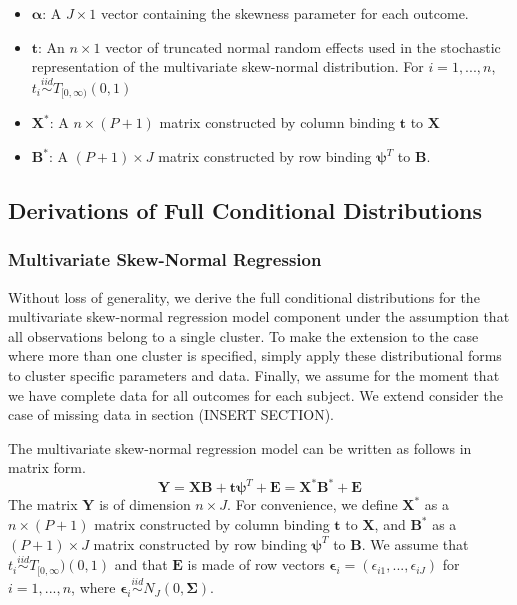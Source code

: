 \documentclass{article}
\begin{document}
\begin{itemize}
    \item $\boldsymbol\alpha$: A $J \times 1$ vector containing the skewness parameter for each outcome.
    
    \item $\mathbf{t}$: An $n \times 1$ vector of truncated normal random effects used in the stochastic representation of the multivariate skew-normal distribution. For $i = 1,...,n$, $t_i \stackrel{iid}{\sim}T_{[0,\infty)}(0,1)$
    
    \item $\mathbf{X}^*$: A $n \times (P + 1)$ matrix constructed by column binding $\mathbf{t}$ to $\mathbf{X}$
    
    \item $\mathbf{B}^*$: A $(P+1) \times J$ matrix constructed by row binding $\boldsymbol\psi^T$ to $\mathbf{B}$.

\end{itemize}

\newpage
\subsection{Derivations of Full Conditional Distributions}

\subsubsection{Multivariate Skew-Normal Regression}

Without loss of generality, we derive the full conditional distributions for the multivariate skew-normal regression model component under the assumption that all observations belong to a single cluster. To make the extension to the case where more than one cluster is specified, simply apply these distributional forms to cluster specific parameters and data. Finally, we assume for the moment that we have complete data for all outcomes for each subject. We extend consider the case of missing data in section (INSERT SECTION).

The multivariate skew-normal regression model can be written as follows in matrix form. 
$$\mathbf{Y} = \mathbf{X}\mathbf{B} + \mathbf{t} \boldsymbol\psi^T + \mathbf{E} = \mathbf{X}^* \mathbf{B}^* + \mathbf{E}$$
The matrix $\mathbf{Y}$ is of dimension $n \times J$. For convenience, we define $\mathbf{X}^*$ as a $n \times (P + 1)$ matrix constructed by column binding $\mathbf{t}$ to $\mathbf{X}$, and $\mathbf{B}^*$ as a $(P+1) \times J$ matrix constructed by row binding $\boldsymbol\psi^T$ to $\mathbf{B}$. We assume that $t_i \stackrel{iid}{\sim}T_{[0,\infty})(0,1)$ and that $\mathbf{E}$ is made of row vectors $\boldsymbol\epsilon_i = (\epsilon_{i1},...,\epsilon_{iJ})$ for $i = 1,...,n$, where $ \boldsymbol\epsilon_i \stackrel{iid}{\sim} N_J(0, \boldsymbol\Sigma)$.
\end{document}
